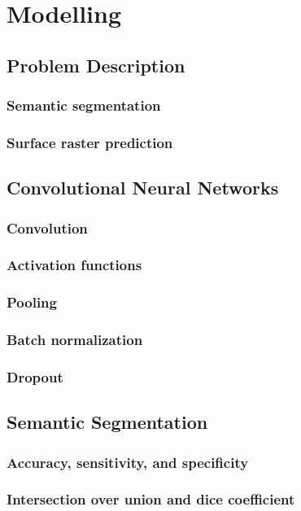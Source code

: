 \chapter{Modelling}

\section{Problem Description}
\subsection{Semantic segmentation}
\subsection{Surface raster prediction}

\section{Convolutional Neural Networks}
\subsection{Convolution}
\subsection{Activation functions}
\subsection{Pooling}
\subsection{Batch normalization}
\subsection{Dropout}

\section{Semantic Segmentation}
\subsection{Accuracy, sensitivity, and specificity}
\subsection{Intersection over union and dice coefficient}
